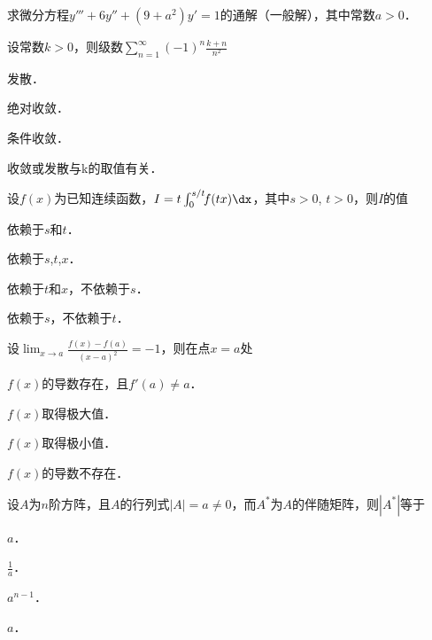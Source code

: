 \documentclass[plain,noanswer,medmath]{../../template/jnuexam}
\begin{document}

\begin{problem}
求微分方程$y''' + 6y'' + (9 + a^2)y' = 1$的通解（一般解），其中常数$a > 0$．
\end{problem}




\begin{problem}
设常数$k > 0$，则级数$\sum_{n = 1}^{\infty}(- 1)^n\frac{k + n}{n^2}$\pickout{}
\begin{abcd}
\item 发散．						
\item 绝对收敛．
\item 条件收敛．				
\item 收敛或发散与k的取值有关．
\end{abcd}
\end{problem}


\begin{problem}
设$f(x)$为已知连续函数，$I=t\int_0^{s/t}\!\!f(tx)\dx$，其中$s>0$, $t>0$，则$I$的值\pickout{}
\begin{abcd}
\item 依赖于$s$和$t$．
\item 依赖于$s$,$t$,$x$．
\item 依赖于$t$和$x$，不依赖于$s$．
\item 依赖于$s$，不依赖于$t$．
\end{abcd}
\end{problem}


\begin{problem}
设$\lim_{x \to a} \frac{f(x)-f(a)}{(x-a)^2}=-1$，则在点$x=a$处\pickout{}
\begin{abcd}
\item $f(x)$的导数存在，且$f'(a) \ne a$．			
\item $f(x)$取得极大值．
\item $f(x)$取得极小值．					
\item $f(x)$的导数不存在．
\end{abcd}
\end{problem}


\begin{problem}
设$A$为$n$阶方阵，且$A$的行列式$|A|=a \ne 0$，而$A^*$为$A$的伴随矩阵，则$|A^*|$等于\pickout{}
\begin{abcd}
\item $a$．       
\item $\frac{1}{a}$．     
\item $a^{n - 1}$．
\item $a$．
\end{abcd}
\end{problem}
\end{document}
